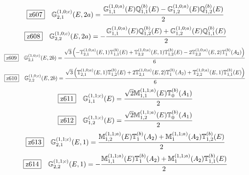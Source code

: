 \documentclass[fleqn,10pt,landscape]{jsarticle}
\begin{document}
\begin{dmath*}
\hspace*{3mm}\fbox{z607}\quad \mathbb{G}_{2,1}^{(1,0;c)}(E,2a)=\frac{\mathbb{G}_{1,1}^{(1,0;a)}(E) \mathbb{Q}_{1,1}^{(b)}(E) - \mathbb{G}_{1,2}^{(1,0;a)}(E) \mathbb{Q}_{1,2}^{(b)}(E)}{2}
\end{dmath*}
\begin{dmath*}
\hspace*{3mm}\fbox{z608}\quad \mathbb{G}_{2,2}^{(1,0;c)}(E,2a)=- \frac{\mathbb{G}_{1,1}^{(1,0;a)}(E) \mathbb{Q}_{1,2}^{(b)}(E) + \mathbb{G}_{1,2}^{(1,0;a)}(E) \mathbb{Q}_{1,1}^{(b)}(E)}{2}
\end{dmath*}
\begin{dmath*}
\hspace*{3mm}\fbox{z609}\quad \mathbb{G}_{2,1}^{(1,0;c)}(E,2b)=\frac{\sqrt{3} \left(- \mathbb{T}_{2,1}^{(1,0;a)}(E,1) \mathbb{T}_{1,1}^{(b)}(E) + \mathbb{T}_{2,2}^{(1,0;a)}(E,1) \mathbb{T}_{1,2}^{(b)}(E) - 2 \mathbb{T}_{2,2}^{(1,0;a)}(E,2) \mathbb{T}_{1}^{(b)}(A_{2})\right)}{6}
\end{dmath*}
\begin{dmath*}
\hspace*{3mm}\fbox{z610}\quad \mathbb{G}_{2,2}^{(1,0;c)}(E,2b)=\frac{\sqrt{3} \left(\mathbb{T}_{2,1}^{(1,0;a)}(E,1) \mathbb{T}_{1,2}^{(b)}(E) + 2 \mathbb{T}_{2,1}^{(1,0;a)}(E,2) \mathbb{T}_{1}^{(b)}(A_{2}) + \mathbb{T}_{2,2}^{(1,0;a)}(E,1) \mathbb{T}_{1,1}^{(b)}(E)\right)}{6}
\end{dmath*}
\begin{dmath*}
\hspace*{3mm}\fbox{z611}\quad \mathbb{G}_{1,1}^{(1,1;c)}(E)=\frac{\sqrt{2} \mathbb{M}_{1,1}^{(1,1;a)}(E) \mathbb{T}_{0}^{(b)}(A_{1})}{2}
\end{dmath*}
\begin{dmath*}
\hspace*{3mm}\fbox{z612}\quad \mathbb{G}_{1,2}^{(1,1;c)}(E)=\frac{\sqrt{2} \mathbb{M}_{1,2}^{(1,1;a)}(E) \mathbb{T}_{0}^{(b)}(A_{1})}{2}
\end{dmath*}
\begin{dmath*}
\hspace*{3mm}\fbox{z613}\quad \mathbb{G}_{2,1}^{(1,1;c)}(E,1)=\frac{\mathbb{M}_{1,2}^{(1,1;a)}(E) \mathbb{T}_{1}^{(b)}(A_{2}) + \mathbb{M}_{1}^{(1,1;a)}(A_{2}) \mathbb{T}_{1,2}^{(b)}(E)}{2}
\end{dmath*}
\begin{dmath*}
\hspace*{3mm}\fbox{z614}\quad \mathbb{G}_{2,2}^{(1,1;c)}(E,1)=- \frac{\mathbb{M}_{1,1}^{(1,1;a)}(E) \mathbb{T}_{1}^{(b)}(A_{2}) + \mathbb{M}_{1}^{(1,1;a)}(A_{2}) \mathbb{T}_{1,1}^{(b)}(E)}{2}
\end{dmath*}
\end{document}
